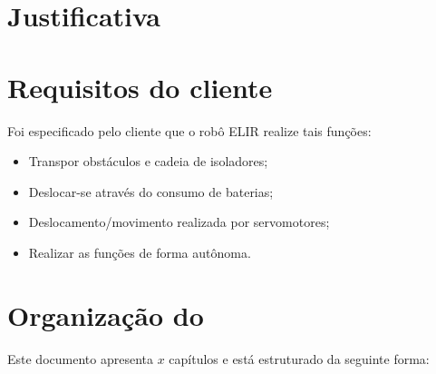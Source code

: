 \section{Justificativa}
\label{sec:justi}


\section{Requisitos do cliente}
\label{sec:reqc}
Foi especificado pelo cliente que o robô ELIR realize tais funções:

\begin{itemize}
	
	\item Transpor obstáculos e cadeia de isoladores;
	\item Deslocar-se através do consumo de baterias;
	\item Deslocamento/movimento realizada por servomotores;
	\item Realizar as funções de forma autônoma.
	
\end{itemize}



\section{Organização do \thetypework}
\label{section:organizacao}

Este documento apresenta $x$ capítulos e está estruturado da seguinte forma:

